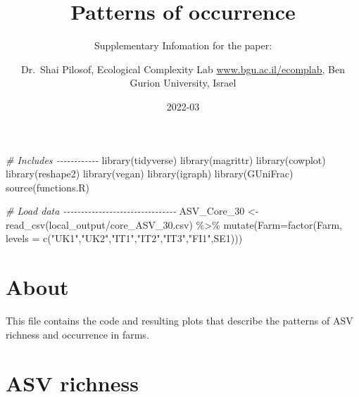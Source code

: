 \documentclass[
]{article}
\title{Patterns of occurrence}
\subtitle{Supplementary Infomation for the paper:}
\author{Dr.~Shai Pilosof, Ecological Complexity Lab
\url{www.bgu.ac.il/ecomplab}, Ben Gurion University, Israel}
\date{2022-03}
\newenvironment{Shaded}{\begin{snugshade}}{\end{snugshade}}
\newcommand{\AttributeTok}[1]{\textcolor[rgb]{0.77,0.63,0.00}{#1}}
\newcommand{\CommentTok}[1]{\textcolor[rgb]{0.56,0.35,0.01}{\textit{#1}}}
\newcommand{\FunctionTok}[1]{\textcolor[rgb]{0.00,0.00,0.00}{#1}}
\newcommand{\NormalTok}[1]{#1}
\newcommand{\OtherTok}[1]{\textcolor[rgb]{0.56,0.35,0.01}{#1}}
\newcommand{\SpecialCharTok}[1]{\textcolor[rgb]{0.00,0.00,0.00}{#1}}
\newcommand{\StringTok}[1]{\textcolor[rgb]{0.31,0.60,0.02}{#1}}
\begin{document}
\maketitle

\begin{Shaded}
\begin{Highlighting}[]
\CommentTok{\# Includes {-}{-}{-}{-}{-}{-}{-}{-}{-}{-}{-}{-}}
\FunctionTok{library}\NormalTok{(tidyverse)}
\FunctionTok{library}\NormalTok{(magrittr)}
\FunctionTok{library}\NormalTok{(cowplot)}
\FunctionTok{library}\NormalTok{(reshape2) }
\FunctionTok{library}\NormalTok{(vegan)}
\FunctionTok{library}\NormalTok{(igraph)}
\FunctionTok{library}\NormalTok{(GUniFrac)}
\FunctionTok{source}\NormalTok{(}\StringTok{\textquotesingle{}functions.R\textquotesingle{}}\NormalTok{)}

\CommentTok{\# Load data {-}{-}{-}{-}{-}{-}{-}{-}{-}{-}{-}{-}{-}{-}{-}{-}{-}{-}{-}{-}{-}{-}{-}{-}{-}{-}{-}{-}{-}{-}{-}{-}}
\NormalTok{ASV\_Core\_30 }\OtherTok{\textless{}{-}} \FunctionTok{read\_csv}\NormalTok{(}\StringTok{\textquotesingle{}local\_output/core\_ASV\_30.csv\textquotesingle{}}\NormalTok{) }\SpecialCharTok{\%\textgreater{}\%} 
  \FunctionTok{mutate}\NormalTok{(}\AttributeTok{Farm=}\FunctionTok{factor}\NormalTok{(Farm, }\AttributeTok{levels =} \FunctionTok{c}\NormalTok{(}\StringTok{"UK1"}\NormalTok{,}\StringTok{"UK2"}\NormalTok{,}\StringTok{"IT1"}\NormalTok{,}\StringTok{"IT2"}\NormalTok{,}\StringTok{"IT3"}\NormalTok{,}\StringTok{"FI1"}\NormalTok{,}\StringTok{\textquotesingle{}SE1\textquotesingle{}}\NormalTok{)))}
\end{Highlighting}
\end{Shaded}

\hypertarget{about}{%
\section{About}\label{about}}

This file contains the code and resulting plots that describe the
patterns of ASV richness and occurrence in farms.

\hypertarget{asv-richness}{%
\section{ASV richness}\label{asv-richness}}
\end{document}
